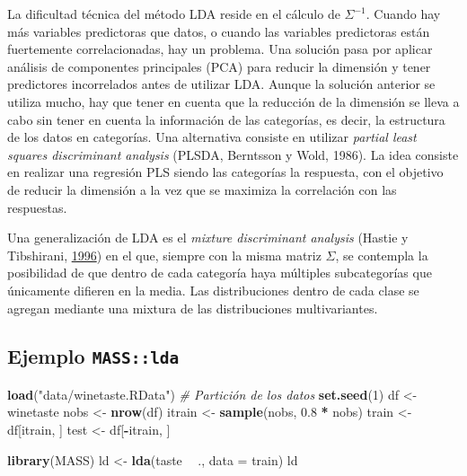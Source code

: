 \documentclass[
  spanish,
]{book}
\newenvironment{Shaded}{\begin{snugshade}}{\end{snugshade}}
\newcommand{\CommentTok}[1]{\textcolor[rgb]{0.56,0.35,0.01}{\textit{#1}}}
\newcommand{\DataTypeTok}[1]{\textcolor[rgb]{0.13,0.29,0.53}{#1}}
\newcommand{\DecValTok}[1]{\textcolor[rgb]{0.00,0.00,0.81}{#1}}
\newcommand{\FloatTok}[1]{\textcolor[rgb]{0.00,0.00,0.81}{#1}}
\newcommand{\KeywordTok}[1]{\textcolor[rgb]{0.13,0.29,0.53}{\textbf{#1}}}
\newcommand{\NormalTok}[1]{#1}
\newcommand{\OperatorTok}[1]{\textcolor[rgb]{0.81,0.36,0.00}{\textbf{#1}}}
\newcommand{\StringTok}[1]{\textcolor[rgb]{0.31,0.60,0.02}{#1}}
\theoremstyle{break}
\theoremstyle{definition}
\theoremstyle{definition}
\theoremstyle{definition}
\theoremstyle{remark}
\begin{document}
La dificultad técnica del método LDA reside en el cálculo de \(\Sigma^{-1}\). Cuando hay más variables predictoras que datos, o cuando las variables predictoras están fuertemente correlacionadas, hay un problema. Una solución pasa por aplicar análisis de componentes principales (PCA) para reducir la dimensión y tener predictores incorrelados antes de utilizar LDA. Aunque la solución anterior se utiliza mucho, hay que tener en cuenta que la reducción de la dimensión se lleva a cabo sin tener en cuenta la información de las categorías, es decir, la estructura de los datos en categorías. Una alternativa consiste en utilizar \emph{partial least squares discriminant analysis} (PLSDA, Berntsson y Wold, 1986). La idea consiste en realizar una regresión PLS siendo las categorías la respuesta, con el objetivo de reducir la dimensión a la vez que se maximiza la correlación con las respuestas.

Una generalización de LDA es el \emph{mixture discriminant analysis} (Hastie y Tibshirani, \protect\hyperlink{ref-hastie1996fisher}{1996}) en el que, siempre con la misma matriz \(\Sigma\), se contempla la posibilidad de que dentro de cada categoría haya múltiples subcategorías que únicamente difieren en la media. Las distribuciones dentro de cada clase se agregan mediante una mixtura de las distribuciones multivariantes.

\hypertarget{ejemplo-masslda}{%
\subsection{\texorpdfstring{Ejemplo \texttt{MASS::lda}}{Ejemplo MASS::lda}}\label{ejemplo-masslda}}

\begin{Shaded}
\begin{Highlighting}[]
\KeywordTok{load}\NormalTok{(}\StringTok{"data/winetaste.RData"}\NormalTok{)}
\CommentTok{# Partición de los datos}
\KeywordTok{set.seed}\NormalTok{(}\DecValTok{1}\NormalTok{)}
\NormalTok{df <-}\StringTok{ }\NormalTok{winetaste}
\NormalTok{nobs <-}\StringTok{ }\KeywordTok{nrow}\NormalTok{(df)}
\NormalTok{itrain <-}\StringTok{ }\KeywordTok{sample}\NormalTok{(nobs, }\FloatTok{0.8} \OperatorTok{*}\StringTok{ }\NormalTok{nobs)}
\NormalTok{train <-}\StringTok{ }\NormalTok{df[itrain, ]}
\NormalTok{test <-}\StringTok{ }\NormalTok{df[}\OperatorTok{-}\NormalTok{itrain, ]}

\KeywordTok{library}\NormalTok{(MASS)}
\NormalTok{ld <-}\StringTok{ }\KeywordTok{lda}\NormalTok{(taste }\OperatorTok{~}\StringTok{ }\NormalTok{., }\DataTypeTok{data =}\NormalTok{ train)}
\NormalTok{ld}
\end{Highlighting}
\end{Shaded}
\end{document}
